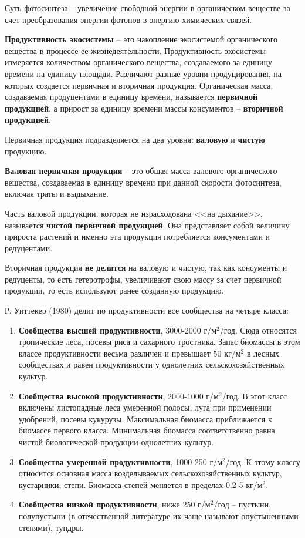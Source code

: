 \documentclass[a5paper, 11pt]{extarticle}
\theoremstyle{definition}
\theoremstyle{definition}
\theoremstyle{definition}
\numberwithin{figure}{section}
\begin{document}
Суть фотосинтеза -- увеличение свободной энергии в органическом веществе за счет преобразования энергии фотонов в энергию химических связей.

\textbf{Продуктивность экосистемы} -- это накопление экосистемой органического вещества в процессе ее жизнедеятельности. Продуктивность экосистемы измеряется количеством органического вещества, создаваемого за единицу времени на единицу площади. Различают разные уровни продуцирования, на которых создается первичная и вторичная продукция. Органическая масса, создаваемая продуцентами в единицу времени, называется \textbf{первичной продукцией}, а прирост за единицу времени массы консументов -- \textbf{вторичной продукцией}.

Первичная продукция подразделяется на два уровня: \textbf{валовую} и \textbf{чистую} продукцию.

\textbf{Валовая первичная продукция} -- это общая масса валового органического вещества, создаваемая в единицу времени при данной скорости фотосинтеза, включая траты и выдыхание.

Часть валовой продукции, которая не израсходована <<на дыхание>>, называется \textbf{чистой первичной продукцией}. Она представляет собой величину прироста растений и именно эта продукция потребляется консументами и редуцентами.

Вторичная продукция \textbf{не делится} на валовую и чистую, так как консументы и редуценты, то есть гетеротрофы, увеличивают свою массу за счет первичной продукции, то есть используют ранее созданную продукцию.

Р. Уиттекер (1980) делит по продуктивности все сообщества на четыре класса:
\begin{enumerate}
    \item \textbf{Сообщества высшей продуктивности}, 3000-2000 г/\(\text{м}^2\)/год. Сюда относятся тропические леса, посевы риса и сахарного тростника. Запас биомассы в этом классе продуктивности весьма различен и превышает 50 кг/\(\text{м}^2\) в лесных сообществах и равен продуктивности у однолетних сельскохозяйственных культур.
    \item \textbf{Сообщества высокой продуктивности}, 2000-1000 г/\(\text{м}^2\)/год. В этот класс включены листопадные леса умеренной полосы, луга при применении удобрений, посевы кукурузы. Максимальная биомасса приближается к биомассе первого класса. Минимальная биомасса соответственно равна чистой биологической продукции однолетних культур.
    \item \textbf{Сообщества умеренной продуктивности}, 1000-250 г/\(\text{м}^2\)/год. К этому классу относится основная масса возделываемых сельскохозяйственных культур, кустарники, степи. Биомасса степей меняется в пределах 0.2-5 кг/\(\text{м}^2\).
    \item \textbf{Сообщества низкой продуктивности}, ниже 250 г/\(\text{м}^2\)/год -- пустыни, полупустыни (в отечественной литературе их чаще называют опустыненными степями), тундры.
\end{enumerate}
\end{document}
